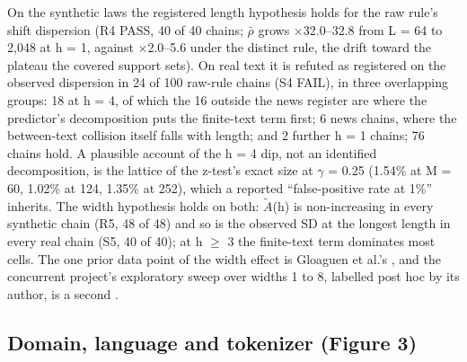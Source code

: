 \documentclass[11pt,letterpaper]{article}
\begin{document}
On the synthetic laws the registered length hypothesis holds for the raw rule's shift dispersion (R4 PASS, 40 of 40 chains; \ensuremath{\bar{\rho}} grows \ensuremath{\times}32.0--32.8 from L = 64 to 2,048 at h = 1, against \ensuremath{\times}2.0--5.6 under the distinct rule, the drift toward the plateau the covered support sets). On real text it is refuted as registered on the observed dispersion in 24 of 100 raw-rule chains (S4 FAIL), in three overlapping groups: 18 at h = 4, of which the 16 outside the news register are where the predictor's decomposition puts the finite-text term first; 6 news chains, where the between-text collision itself falls with length; and 2 further h = 1 chains; 76 chains hold. A plausible account of the h = 4 dip, not an identified decomposition, is the lattice of the z-test's exact size at \ensuremath{\gamma} = 0.25 (1.54\% at M = 60, 1.02\% at 124, 1.35\% at 252), which a reported ``false-positive rate at 1\%'' inherits. The width hypothesis holds on both: \ensuremath{\tilde{A}}(h) is non-increasing in every synthetic chain (R5, 48 of 48) and so is the observed SD at the longest length in every real chain (S5, 40 of 40); at h \ensuremath{\geq} 3 the finite-text term dominates most cells. The one prior data point of the width effect is Gloaguen et al.'s \citep{gloaguen2026diffusion}, and the concurrent project's exploratory sweep over widths 1 to 8, labelled post hoc by its author, is a second \citep{yukhimchuk2026keylottery}.

\hypertarget{domain-language-and-tokenizer-figure-3}{%
\subsection{Domain, language and tokenizer (Figure 3)}\label{domain-language-and-tokenizer-figure-3}}
\end{document}
